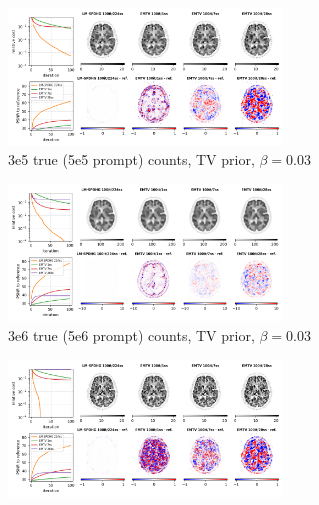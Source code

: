 \begin{figure}
  \centering
  \begin{subfigure}[]{1.0\textwidth}
    \centering
    \includegraphics[width=0.8\textwidth]{./figure4a_brain2d_counts_3.0E+05_seed_1_beta_3.0E-02_prior_TV_niter_ref_20000_fwhm_4.5_4.5_niter_100_emtv.png}
    \caption{3e5 true (5e5 prompt) counts, TV prior, $\beta = 0.03$}
  \end{subfigure}
  \vfill
  \begin{subfigure}[]{1.0\textwidth}
    \centering
    \includegraphics[width=0.8\textwidth]{./figure4b_brain2d_counts_3.0E+06_seed_1_beta_3.0E-02_prior_TV_niter_ref_20000_fwhm_4.5_4.5_niter_100_emtv.png}
    \caption{3e6 true (5e6 prompt) counts, TV prior, $\beta = 0.03$}
  \end{subfigure}
  \vfill
  \begin{subfigure}[]{1.0\textwidth}
    \centering
    \includegraphics[width=0.8\textwidth]{./figure4c_brain2d_counts_3.0E+05_seed_1_beta_1.0E-01_prior_DTV_niter_ref_20000_fwhm_4.5_4.5_niter_100_emtv.png}

\end{subfigure}
\end{figure}
